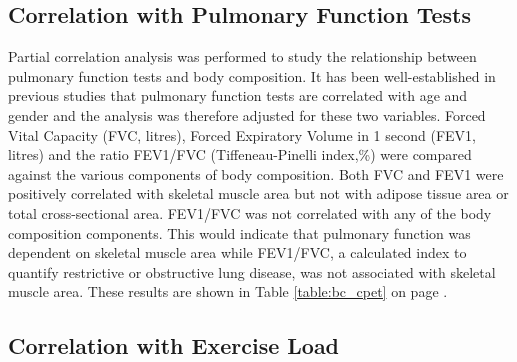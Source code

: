 \subsection{Correlation with Pulmonary Function Tests}

Partial correlation analysis was performed to study the relationship between pulmonary function tests and body composition. It has been well-established in previous studies that pulmonary function tests are correlated with age and gender and the analysis was therefore adjusted for these two variables. Forced Vital Capacity (FVC, litres), Forced Expiratory Volume in 1 second (FEV1, litres) and the ratio FEV1/FVC (Tiffeneau-Pinelli index,\%) were compared against the various components of body composition. Both FVC and FEV1 were positively correlated with skeletal muscle area but not with adipose tissue area or total cross-sectional area. FEV1/FVC was not correlated with any of the body composition components. 
This would indicate that pulmonary function was dependent on skeletal muscle area while FEV1/FVC, a calculated index to quantify restrictive or obstructive lung disease, was not associated with skeletal muscle area. These results are shown in Table \ref{table:bc_cpet} on page \pageref{table:bc_cpet}.

\subsection{Correlation with Exercise Load}

